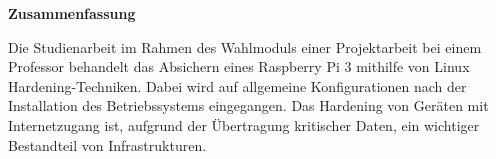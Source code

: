 
\textbf{\large Zusammenfassung}
\begin{justify}
    Die Studienarbeit im Rahmen des Wahlmoduls einer Projektarbeit bei einem Professor behandelt das Absichern
    eines Raspberry Pi 3 mithilfe von Linux Hardening-Techniken.
    Dabei wird auf allgemeine Konfigurationen nach der Installation des Betriebssystems eingegangen.
    Das Hardening von Geräten mit Internetzugang ist, aufgrund der Übertragung kritischer Daten, ein wichtiger
    Bestandteil von Infrastrukturen.
\end{justify}

